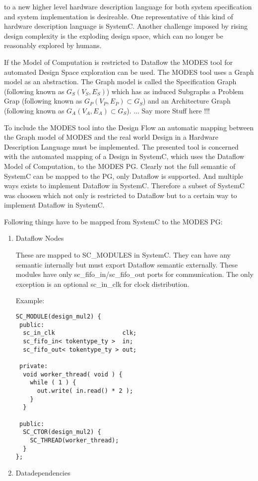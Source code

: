 to a new higher level hardware description
language for both system specification and system implementation is
desireable. One representative of this kind of hardware description
language is SystemC. Another challenge imposed by rising design complexity
is the exploding design space, which can no longer be reasonably explored
by humans.


If the Model of Computation is restricted to Dataflow the
MODES tool for automated Design Space exploration can be used. The MODES
tool uses a Graph model as an abstraction. The Graph model is called the
Specification Graph (following known as $G_{S}(V_{S},E_{S})$) which has as
induced Subgraphs a Problem Grap (following known as $G_{P}(V_{P},E_{P}) \subset G_{S}$) and
an Architecture Graph (following known as $G_{A}(V_{A},E_{A}) \subset G_{S}$).
... Say more Stuff here !!!
\par
To include the MODES tool into the Design Flow an automatic mapping between
the Graph model of MODES and the real world Design in a Hardware Description
Language must be implemented. The presented tool is concerned with the automated
mapping of a Design in SystemC, which uses the Dataflow Model of Computation,
to the MODES PG. Clearly not the full semantic of SystemC can be mapped to the
PG, only Dataflow is supported. And multiple ways exists to implement
Dataflow in SystemC. Therefore a subset of SystemC was choosen which not only
is restricted to Dataflow but to a certain way to implement Dataflow in SystemC.
\par
Following things have to be mapped from SystemC to the MODES PG:
\begin{enumerate}
\item Dataflow Nodes

These are mapped to SC\_MODULES in SystemC. They can have any semantic internally
but must export Dataflow semantic externally. These modules have only sc\_fifo\_in/sc\_fifo\_out
ports for communication. The only exception is an optional sc\_in\_clk for clock distribution.

Example:
\begin{verbatim}
SC_MODULE(design_mul2) {
 public:
  sc_in_clk                   clk;
  sc_fifo_in< tokentype_ty >  in;
  sc_fifo_out< tokentype_ty > out;

 private:
  void worker_thread( void ) {
    while ( 1 ) {
      out.write( in.read() * 2 );
    }
  }

 public:
  SC_CTOR(design_mul2) {
    SC_THREAD(worker_thread);
  }
};
\end{verbatim}
\item Datadependencies
\end{enumerate}

